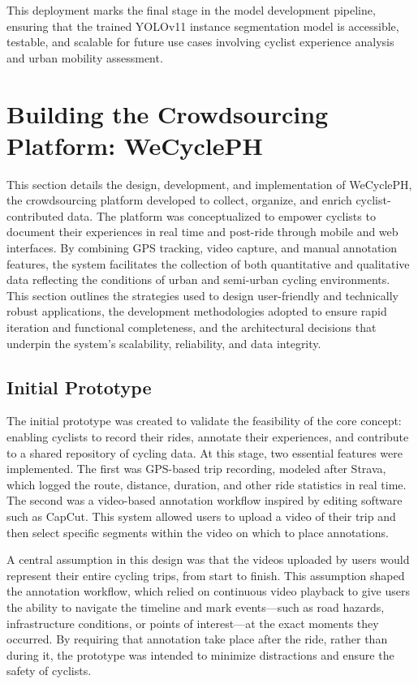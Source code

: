 This deployment marks the final stage in the model development pipeline, ensuring that the trained YOLOv11 instance segmentation model is accessible, testable, and scalable for future use cases involving cyclist experience analysis and urban mobility assessment.

\section{Building the Crowdsourcing Platform: WeCyclePH}

This section details the design, development, and implementation of WeCyclePH, the crowdsourcing platform developed to collect, organize, and enrich cyclist-contributed data. The platform was conceptualized to empower cyclists to document their experiences in real time and post-ride through mobile and web interfaces. By combining GPS tracking, video capture, and manual annotation features, the system facilitates the collection of both quantitative and qualitative data reflecting the conditions of urban and semi-urban cycling environments. This section outlines the strategies used to design user-friendly and technically robust applications, the development methodologies adopted to ensure rapid iteration and functional completeness, and the architectural decisions that underpin the system's scalability, reliability, and data integrity.

\subsection{Initial Prototype}

The initial prototype was created to validate the feasibility of the core concept: enabling cyclists to record their rides, annotate their experiences, and contribute to a shared repository of cycling data. At this stage, two essential features were implemented. The first was GPS-based trip recording, modeled after Strava, which logged the route, distance, duration, and other ride statistics in real time. The second was a video-based annotation workflow inspired by editing software such as CapCut. This system allowed users to upload a video of their trip and then select specific segments within the video on which to place annotations.

A central assumption in this design was that the videos uploaded by users would represent their entire cycling trips, from start to finish. This assumption shaped the annotation workflow, which relied on continuous video playback to give users the ability to navigate the timeline and mark events—such as road hazards, infrastructure conditions, or points of interest—at the exact moments they occurred. By requiring that annotation take place after the ride, rather than during it, the prototype was intended to minimize distractions and ensure the safety of cyclists.

